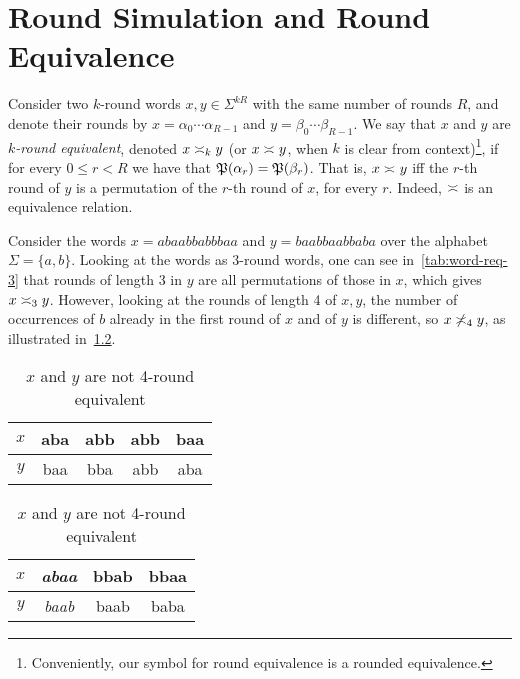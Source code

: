 \chapter{Round Simulation and Round Equivalence}
\label{chap:round_equivalence}

Consider two $k$-round words $x,y\in \Sigma^{kR}$ with the same number of rounds $R$, and denote their rounds by $x=\alpha_0\cdots \alpha_{R-1}$ and $y=\beta_0\cdots \beta_{R-1}$. We say that $x$ and $y$ are \emph{$k$-round equivalent}, denoted $x\req[k] y$ (or $x\req y$, when $k$ is clear from context)\footnote{Conveniently, our symbol for round equivalence is a rounded equivalence.}, if for every $0\le r<R$ we have that $\fP(\alpha_r)=\fP(\beta_r)$. That is, $x\req y$ iff the $r$-th round of $y$ is a permutation of the $r$-th round of $x$, for every $r$. Indeed, $\req$ is an equivalence relation.

\begin{example}
\label{example:word-req}
Consider the words $x=abaabbabbbaa$ and $y=baabbaabbaba$ over the alphabet $\Sigma=\{a,b\}$. Looking at the words as $3$-round words, one can see in~\cref{tab:word-req-3} that rounds of length 3 in $y$ are all permutations of those in $x$, which gives $x\req[3] y$. However, looking at the rounds of length 4 of $x,y$, the number of occurrences of $b$ already in the first round of $x$ and of $y$ is different, so $x\not\req[4] y$, as illustrated in~\cref{tab:word-req-4}.
\begin{table}[!htb]
\begin{minipage}{.5\linewidth}
    \centering
    \caption{$x$ and $y$ are 3-round equivalent}
    \vspace{2mm}
    \begin{tabular}{c||c|c|c|c}
        $x$ & aba & abb & abb & baa \\
        \hline
        $y$ & baa & bba & abb & aba \\
    \end{tabular}
    \label{tab:word-req-3}
\end{minipage}%
\begin{minipage}{.5\linewidth}
    \centering
    \caption{$x$ and $y$ are not 4-round equivalent}
    \vspace{2mm}
    \begin{tabular}{c||c|c|c}
        $x$ & \emph{abaa} & bbab & bbaa \\
        \hline
        $y$ & \emph{baab} & baab & baba \\
    \end{tabular}
    \label{tab:word-req-4}
\end{minipage}
\end{table}
\end{example}

